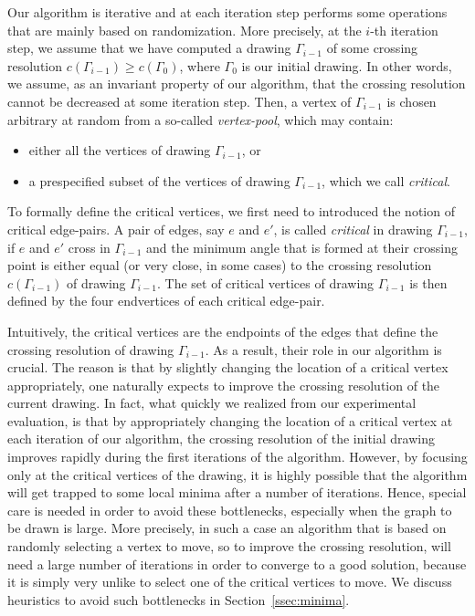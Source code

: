 \documentclass{llncs}
\begin{document}
Our algorithm is iterative and at each iteration step performs some operations that are mainly based on randomization. More precisely, at the $i$-th iteration step, we assume that we have computed a drawing $\Gamma_{i-1}$ of some crossing resolution $c(\Gamma_{i-1}) \geq c(\Gamma_0)$, where $\Gamma_0$ is our initial drawing. In other words, we assume, as an invariant property of our algorithm, that the crossing resolution cannot be decreased at some iteration step. Then, a vertex of $\Gamma_{i-1}$ is chosen arbitrary at random from a so-called \emph{vertex-pool}, which may contain:

\begin{itemize}
\item either all the vertices of drawing $\Gamma_{i-1}$, or
\item a prespecified subset of the vertices of drawing $\Gamma_{i-1}$, which we call \emph{critical}.
\end{itemize}

To formally define the critical vertices, we first need to introduced the notion of critical edge-pairs. A pair of edges, say $e$ and $e'$, is called \emph{critical} in drawing $\Gamma_{i-1}$, if $e$ and $e'$ cross in $\Gamma_{i-1}$ and the minimum angle that is formed at their crossing point is either equal (or very close, in some cases) to the crossing resolution $c(\Gamma_{i-1})$ of drawing $\Gamma_{i-1}$. The set of critical vertices of drawing $\Gamma_{i-1}$ is then defined by the four endvertices of each critical edge-pair.  

Intuitively, the critical vertices are the endpoints of the edges that define the crossing resolution of drawing $\Gamma_{i-1}$. As a result, their role in our algorithm is crucial. The reason is that by slightly changing the location of a critical vertex appropriately, one naturally expects to improve the crossing resolution of the current drawing. In fact, what quickly we realized from our experimental evaluation, is that by appropriately changing the location of a critical vertex at each iteration of our algorithm, the crossing resolution of the initial drawing improves rapidly during the first iterations of the algorithm. However, by focusing only at the critical vertices of the drawing, it is highly possible that the algorithm will get trapped to some local minima after a number of iterations. Hence, special care is needed in order to avoid these bottlenecks, especially when the graph to be drawn is large. More precisely, in such a case an algorithm that is based on randomly selecting a vertex to move, so to improve the crossing resolution, will need a large number of iterations in order to converge to a good solution, because it is simply very unlike to select one of the critical vertices to move. We discuss heuristics to avoid such bottlenecks in  Section~\ref{ssec:minima}.
\end{document}
